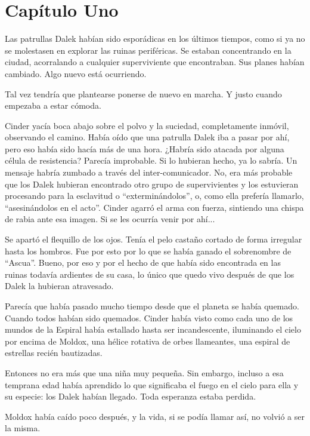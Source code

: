 \chapter*{Capítulo Uno}

Las patrullas Dalek habían sido esporádicas en los últimos tiempos, como si ya no se molestasen en explorar las ruinas periféricas. Se estaban concentrando en la ciudad, acorralando a cualquier superviviente que encontraban. Sus planes habían cambiado. Algo nuevo está ocurriendo.

Tal vez tendría que plantearse ponerse de nuevo en marcha. Y justo cuando empezaba a estar cómoda.

Cinder yacía boca abajo sobre el polvo y la suciedad, completamente inmóvil, observando el camino. Había oído que una patrulla Dalek iba a pasar por ahí, pero eso había sido hacía más de una hora. ¿Habría sido atacada por alguna célula de resistencia? Parecía improbable. Si lo hubieran hecho, ya lo sabría. Un mensaje habría zumbado a través del inter-comunicador. No, era más probable que los Dalek hubieran encontrado otro grupo de supervivientes y los estuvieran procesando para la esclavitud o “exterminándolos”, o, como ella prefería llamarlo, ``asesinándolos en el acto''. Cinder agarró el arma con fuerza, sintiendo una chispa de rabia ante esa imagen. Si se les ocurría venir por ahí...

Se apartó el flequillo de los ojos. Tenía el pelo castaño cortado de forma irregular hasta los hombros. Fue por esto por lo que se había ganado el sobrenombre de “Ascua”. Bueno, por eso y por el hecho de que había sido encontrada en las ruinas todavía ardientes de su casa, lo único que quedo vivo después de que los Dalek la hubieran atravesado.

Parecía que había pasado mucho tiempo desde que el planeta se había quemado. Cuando todos habían sido quemados. Cinder había visto como cada uno de los mundos de la Espiral había estallado hasta ser incandescente, iluminando el cielo por encima de Moldox, una hélice rotativa de orbes llameantes, una espiral de estrellas recién bautizadas.

Entonces no era más que una niña muy pequeña. Sin embargo, incluso a esa temprana edad había aprendido lo que significaba el fuego en el cielo para ella y su especie: los Dalek habían llegado. Toda esperanza estaba perdida.

Moldox había caído poco después, y la vida, si se podía llamar así, no volvió a ser la misma.

